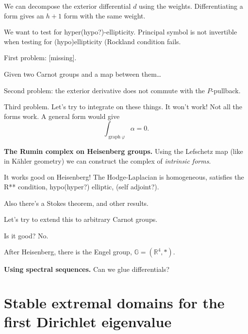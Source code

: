 We can decompose the exterior differential
$d$ using the weights. Differentiating
a form gives an $h+1$
form with the same weight.

We want to test for hyper(hypo?)-ellipticity.
Principal symbol is not invertible when
testing for (hypo)ellipticity (Rockland
condition fails.

First problem: [missing].

\begin{definition}
\label{definition-pansu-derivative}
Given two Carnot groups and a map between
them…
\end{definition}

\noindent
Second problem: the exterior derivative
does not commute with the $P$-pullback.

\medskip\noindent
Third problem.
Let's try to integrate on these things.
It won't work! Not all the forms work.
A general form would give
$$
\int_{\operatorname{graph}\varphi}\alpha=0.
$$

\medskip\noindent
{\bf The Rumin complex on Heisenberg groups.}
Using the Lefschetz map (like in Kähler
geometry) we can construct the complex
of {\it intrinsic forms}.

It works good on Heisenberg! The Hodge-Laplacian
is homogeneous, satisfies the R** condition,
hypo(hyper?) elliptic, (self adjoint?).

\begin{theorem}[Rumin ;00]
\label{theorem-rumin00}

\end{theorem}

\noindent
Also there's a Stokes theorem, and other
results.

Let's try to extend this to arbitrary Carnot
groups.

\begin{definition}
\label{definition-rumin-complex}

\end{definition}

\noindent
Is it good? No.

After Heisenberg, there is the Engel group,
$\mathbb{G}=(\mathbb{R}^4,*)$.

\medskip\noindent
{\bf Using spectral sequences.}
Can we glue differentials?

\section{Stable extremal domains for the
first Dirichlet eigenvalue}
\label{section-stable-extremal-domains}

